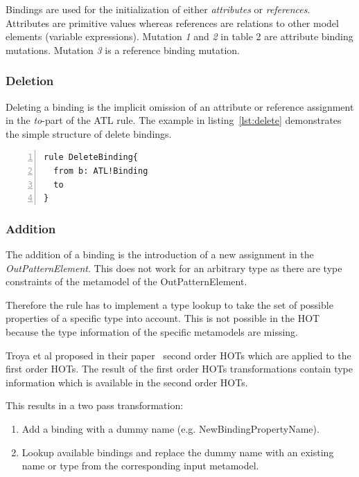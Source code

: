 \documentclass{llncs}
\begin{document}
Bindings are used for the initialization of either \emph{attributes} or \emph{references}. Attributes are primitive values whereas references are relations to other model elements (variable expressions). Mutation \emph{1} and \emph{2} in table 2 are attribute binding mutations. Mutation \emph{3} is a reference binding mutation.

\subsubsection{Deletion}

Deleting a binding is the implicit omission of an attribute or reference assignment in the \emph{to}-part of the ATL rule. The example in listing~\ref{lst:delete} demonstrates the simple structure of delete bindings.

\begin{lstlisting}[language=ATL, numbers=left,xleftmargin=5.0ex, caption=Definition of Delete-Binding., label=lst:delete]
rule DeleteBinding{
  from b: ATL!Binding
  to
}
\end{lstlisting}

\subsubsection{Addition}

The addition of a binding is the introduction of a new assignment in the \emph{OutPatternElement}. This does not work for an arbitrary type as there are type constraints of the metamodel of the OutPatternElement.

Therefore the rule has to implement a type lookup to take the set of possible properties of a specific type into account. This is not possible in the HOT because the type information of the specific metamodels are missing. 

Troya et al proposed in their paper~\cite{Bergmayr:2014} second order HOTs which are applied to the first order HOTs. The result of the first order HOTs transformations contain type information which is available in the second order HOTs.

This results in a two pass transformation:

\begin{enumerate}
	\item Add a binding with a dummy name (e.g. NewBindingPropertyName).
	\item Lookup available bindings and replace the dummy name with an existing name or type from the corresponding input metamodel.
\end{enumerate}
\end{document}

